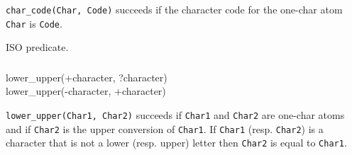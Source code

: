 \Description

\texttt{char\_code(Char, Code)} succeeds if the character code for the
one-char atom \texttt{Char} is \texttt{Code}.

\begin{PlErrors}





\end{PlErrors}

\Portability

ISO predicate.

\subsubsection{}

\begin{TemplatesOneCol}
lower\_upper(+character, ?character)\\
lower\_upper(-character, +character)

\end{TemplatesOneCol}

\Description

\texttt{lower\_upper(Char1, Char2)} succeeds if \texttt{Char1} and
\texttt{Char2} are one-char atoms and if \texttt{Char2} is the upper
conversion of \texttt{Char1}. If \texttt{Char1} (resp. \texttt{Char2}) is a
character that is not a lower (resp. upper) letter then \texttt{Char2} is
equal to \texttt{Char1}.

\begin{PlErrors}




\end{PlErrors}

